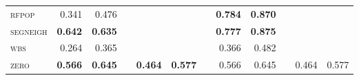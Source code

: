 \begin{tabular}{lrrcrrcrrcrr}
\textsc{rfpop}    & 0.341          & 0.476          &  &                &                &  & \textbf{0.784} & \textbf{0.870} &  &                &                \\
\textsc{segneigh} & \textbf{0.642} & \textbf{0.635} &  &                &                &  & \textbf{0.777} & \textbf{0.875} &  &                &                \\
\textsc{wbs}      & 0.264          & 0.365          &  &                &                &  & 0.366          & 0.482          &  &                &                \\
\textsc{zero}     & \textbf{0.566} & \textbf{0.645} &  & \textbf{0.464} & \textbf{0.577} &  & 0.566          & 0.645          &  & 0.464          & 0.577          \\
\bottomrule
\end{tabular}